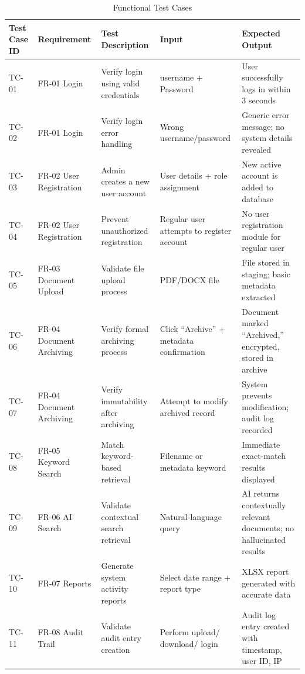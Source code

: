 \begin{table}[H]
\centering
\caption{Functional Test Cases}
\footnotesize
\renewcommand{\arraystretch}{0.8}
\setlength{\tabcolsep}{5pt}
\begin{tabularx}{\textwidth}{|p{1.6cm}|p{2.1cm}|X|p{2.5cm}|p{3cm}|}
\hline
\textbf{Test Case ID} & \textbf{Requirement} & \textbf{Test Description} & \textbf{Input} & \textbf{Expected Output} \\ \hline

TC-01 & FR-01 Login & Verify login using valid credentials & username + Password & User successfully logs in within 3 seconds \\ \hline

TC-02 & FR-01 Login & Verify login error handling & Wrong username/password & Generic error message; no system details revealed \\ \hline

TC-03 & FR-02 User Registration & Admin creates a new user account & User details + role assignment & New active account is added to database \\ \hline

TC-04 & FR-02 User Registration & Prevent unauthorized registration & Regular user attempts to register account & No user registration module for regular user \\ \hline

TC-05 & FR-03 Document Upload & Validate file upload process & PDF/DOCX file & File stored in staging; basic metadata extracted \\ \hline

TC-06 & FR-04 Document Archiving & Verify formal archiving process & Click “Archive” + metadata confirmation & Document marked “Archived,” encrypted, stored in archive \\ \hline

TC-07 & FR-04 Document Archiving & Verify immutability after archiving & Attempt to modify archived record & System prevents modification; audit log recorded \\ \hline

TC-08 & FR-05 Keyword Search & Match keyword-based retrieval & Filename or metadata keyword & Immediate exact-match results displayed \\ \hline

TC-09 & FR-06 AI Search & Validate contextual search retrieval & Natural-language query & AI returns contextually relevant documents; no hallucinated results \\ \hline

TC-10 & FR-07 Reports & Generate system activity reports & Select date range + report type & XLSX report generated with accurate data \\ \hline

TC-11 & FR-08 Audit Trail & Validate audit entry creation & Perform upload/ download/ login & Audit log entry created with timestamp, user ID, IP \\ \hline


\end{tabularx}
\end{table}
